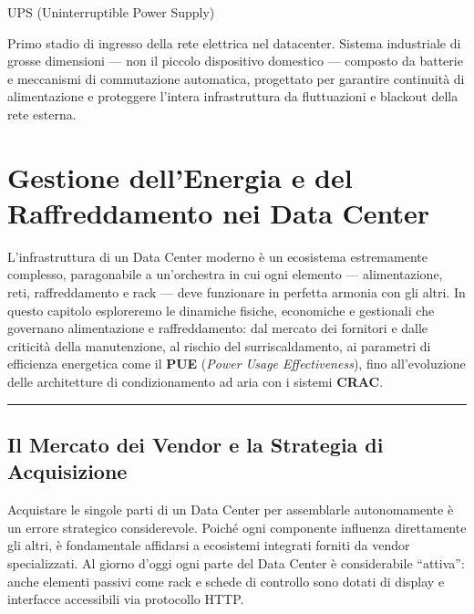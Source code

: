 \documentclass[
  italian,
  openany]{book}
\begin{document}
\begin{calloutdefinition}{UPS (Uninterruptible Power Supply)}

Primo stadio di ingresso della rete elettrica nel datacenter. Sistema
industriale di grosse dimensioni --- non il piccolo dispositivo
domestico --- composto da batterie e meccanismi di commutazione
automatica, progettato per garantire continuità di alimentazione e
proteggere l'intera infrastruttura da fluttuazioni e blackout della rete
esterna.

\end{calloutdefinition}

\newpage

\chapter{Gestione dell'Energia e del Raffreddamento nei Data
Center}\label{gestione-dellenergia-e-del-raffreddamento-nei-data-center}

L'infrastruttura di un Data Center moderno è un ecosistema estremamente
complesso, paragonabile a un'orchestra in cui ogni elemento ---
alimentazione, reti, raffreddamento e rack --- deve funzionare in
perfetta armonia con gli altri. In questo capitolo esploreremo le
dinamiche fisiche, economiche e gestionali che governano alimentazione e
raffreddamento: dal mercato dei fornitori e dalle criticità della
manutenzione, al rischio del surriscaldamento, ai parametri di
efficienza energetica come il \textbf{PUE} (\emph{Power Usage
Effectiveness}), fino all'evoluzione delle architetture di
condizionamento ad aria con i sistemi \textbf{CRAC}.

\begin{center}\rule{0.5\linewidth}{0.5pt}\end{center}

\section{Il Mercato dei Vendor e la Strategia di
Acquisizione}\label{il-mercato-dei-vendor-e-la-strategia-di-acquisizione}

Acquistare le singole parti di un Data Center per assemblarle
autonomamente è un errore strategico considerevole. Poiché ogni
componente influenza direttamente gli altri, è fondamentale affidarsi a
ecosistemi integrati forniti da vendor specializzati. Al giorno d'oggi
ogni parte del Data Center è considerabile ``attiva'': anche elementi
passivi come rack e schede di controllo sono dotati di display e
interfacce accessibili via protocollo HTTP.
\end{document}
